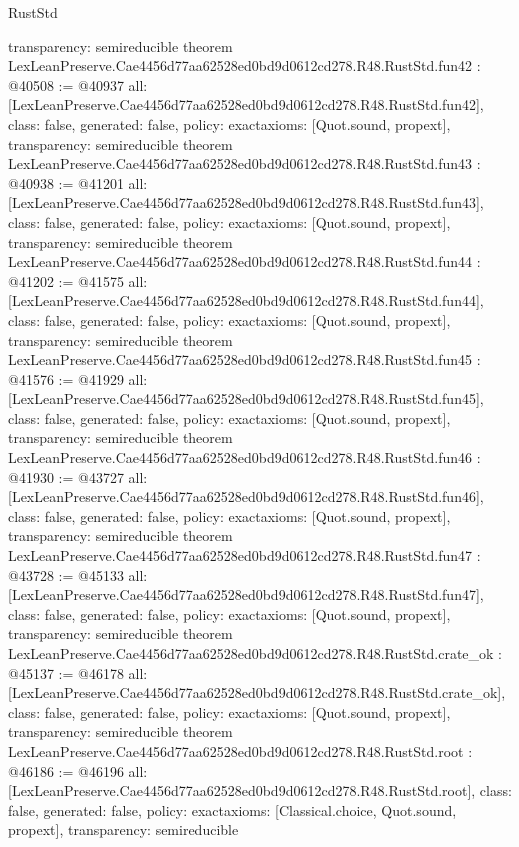 \begin{lexlean}{RustStd}
\begin{coremodule}
{  transparency: semireducible
}
theorem LexLeanPreserve.Cae4456d77aa62528ed0bd9d0612cd278.R48.RustStd.fun42 : @40508 := @40937 {
  all: [LexLeanPreserve.Cae4456d77aa62528ed0bd9d0612cd278.R48.RustStd.fun42],
  class: false,
  generated: false,
  policy: exact{axioms: [Quot.sound, propext]},
  transparency: semireducible
}
theorem LexLeanPreserve.Cae4456d77aa62528ed0bd9d0612cd278.R48.RustStd.fun43 : @40938 := @41201 {
  all: [LexLeanPreserve.Cae4456d77aa62528ed0bd9d0612cd278.R48.RustStd.fun43],
  class: false,
  generated: false,
  policy: exact{axioms: [Quot.sound, propext]},
  transparency: semireducible
}
theorem LexLeanPreserve.Cae4456d77aa62528ed0bd9d0612cd278.R48.RustStd.fun44 : @41202 := @41575 {
  all: [LexLeanPreserve.Cae4456d77aa62528ed0bd9d0612cd278.R48.RustStd.fun44],
  class: false,
  generated: false,
  policy: exact{axioms: [Quot.sound, propext]},
  transparency: semireducible
}
theorem LexLeanPreserve.Cae4456d77aa62528ed0bd9d0612cd278.R48.RustStd.fun45 : @41576 := @41929 {
  all: [LexLeanPreserve.Cae4456d77aa62528ed0bd9d0612cd278.R48.RustStd.fun45],
  class: false,
  generated: false,
  policy: exact{axioms: [Quot.sound, propext]},
  transparency: semireducible
}
theorem LexLeanPreserve.Cae4456d77aa62528ed0bd9d0612cd278.R48.RustStd.fun46 : @41930 := @43727 {
  all: [LexLeanPreserve.Cae4456d77aa62528ed0bd9d0612cd278.R48.RustStd.fun46],
  class: false,
  generated: false,
  policy: exact{axioms: [Quot.sound, propext]},
  transparency: semireducible
}
theorem LexLeanPreserve.Cae4456d77aa62528ed0bd9d0612cd278.R48.RustStd.fun47 : @43728 := @45133 {
  all: [LexLeanPreserve.Cae4456d77aa62528ed0bd9d0612cd278.R48.RustStd.fun47],
  class: false,
  generated: false,
  policy: exact{axioms: [Quot.sound, propext]},
  transparency: semireducible
}
theorem LexLeanPreserve.Cae4456d77aa62528ed0bd9d0612cd278.R48.RustStd.crate_ok : @45137 := @46178 {
  all: [LexLeanPreserve.Cae4456d77aa62528ed0bd9d0612cd278.R48.RustStd.crate_ok],
  class: false,
  generated: false,
  policy: exact{axioms: [Quot.sound, propext]},
  transparency: semireducible
}
theorem LexLeanPreserve.Cae4456d77aa62528ed0bd9d0612cd278.R48.RustStd.root : @46186 := @46196 {
  all: [LexLeanPreserve.Cae4456d77aa62528ed0bd9d0612cd278.R48.RustStd.root],
  class: false,
  generated: false,
  policy: exact{axioms: [Classical.choice, Quot.sound, propext]},
  transparency: semireducible
}


\end{coremodule}
\end{lexlean}
